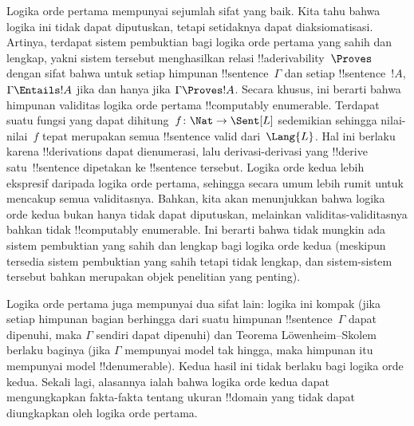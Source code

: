 \documentclass[../../../include/open-logic-section]{subfiles}
\begin{document}


Logika orde pertama mempunyai sejumlah sifat yang baik. Kita tahu bahwa
logika ini tidak dapat diputuskan, tetapi setidaknya dapat diaksiomatisasi.
Artinya, terdapat sistem pembuktian bagi logika orde pertama yang sahih dan
lengkap, yakni sistem tersebut menghasilkan relasi !!a{derivability}~$\Proves$
dengan sifat bahwa untuk setiap himpunan !!{sentence}~$\Gamma$ dan setiap
!!{sentence}~$!A$, $\Gamma \Entails !A$ jika dan hanya jika $\Gamma \Proves
!A$. Secara khusus, ini berarti bahwa himpunan validitas logika orde pertama
!!{computably enumerable}. Terdapat suatu fungsi yang dapat dihitung~$f\colon
\Nat \to \Sent[L]$ sedemikian sehingga nilai-nilai~$f$ tepat merupakan semua
!!{sentence} valid dari~$\Lang{L}$. Hal ini berlaku karena !!{derivation}s dapat
dienumerasi, lalu derivasi-derivasi yang !!{derive} satu~!!{sentence} dipetakan
ke !!{sentence} tersebut. Logika orde kedua lebih ekspresif daripada logika
orde pertama, sehingga secara umum lebih rumit untuk mencakup semua
validitasnya. Bahkan, kita akan menunjukkan bahwa logika orde kedua bukan
hanya tidak dapat diputuskan, melainkan validitas-validitasnya bahkan tidak
!!{computably enumerable}. Ini berarti bahwa tidak mungkin ada sistem
pembuktian yang sahih dan lengkap bagi logika orde kedua (meskipun tersedia
sistem pembuktian yang sahih tetapi tidak lengkap, dan sistem-sistem tersebut
bahkan merupakan objek penelitian yang penting).

Logika orde pertama juga mempunyai dua sifat lain: logika ini kompak (jika
setiap himpunan bagian berhingga dari suatu himpunan !!{sentence}~$\Gamma$
dapat dipenuhi, maka $\Gamma$ sendiri dapat dipenuhi) dan Teorema
L\"owenheim--Skolem berlaku baginya (jika $\Gamma$ mempunyai model tak hingga,
maka himpunan itu mempunyai model !!{denumerable}). Kedua hasil ini tidak berlaku
bagi logika orde kedua. Sekali lagi, alasannya ialah bahwa logika orde kedua
dapat mengungkapkan fakta-fakta tentang ukuran !!{domain} yang tidak dapat
diungkapkan oleh logika orde pertama.
\end{document}
